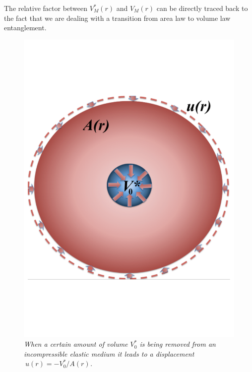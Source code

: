 \documentclass[a4paper,12pt]{article}
\begin{document}
The relative factor between $V_M^*(r)$ and $V_M(r) $ can be directly traced back to the fact that we 
are dealing with a transition from area law to volume law entanglement. 




 \begin{figure}[btp]
\begin{center}
\vspace{-1.2 cm}
\includegraphics[scale=0.30]{Displacement2.pdf}
\vspace{-2.0 cm}
\end{center}
\caption{\small \it When a certain amount of volume $V_0^*$ is being removed from an incompressible elastic medium it leads to a displacement $\ u(r) = -V_0^*/A(r)$.}
\end{figure}
 
\end{document}
